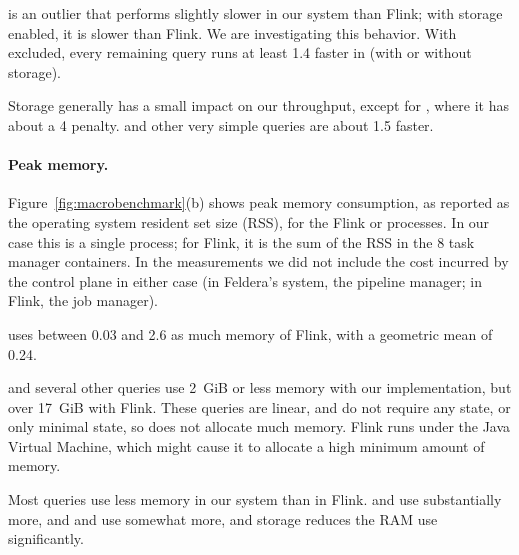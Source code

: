 is an outlier that performs slightly slower in our system
than Flink; with storage enabled, it is slower than Flink.  We are
investigating this behavior.  With  excluded, every
remaining query runs at least 1.4\x{} faster in \dbsp (with or without
storage).

Storage generally has a small impact on our throughput, except for
, where it has about a 4\x{} penalty.   and other
very simple queries are about 1.5\x{} faster.

\paragraph{Peak memory.}

Figure~\ref{fig:macrobenchmark}(b) shows peak memory consumption, as
reported as the operating system resident set size (RSS), for the
Flink or \dbsp processes.  In our case this is a single process; for
Flink, it is the sum of the RSS in the 8 task manager containers.  In
the measurements we did not include the cost incurred by the control
plane in either case (in Feldera's system, the pipeline manager; in
Flink, the job manager).

\dbsp uses between 0.03\x{} and 2.6\x{} as much memory of Flink, with a
geometric mean of 0.24\x{}.

 and several other queries use 2~GiB or less memory with our
implementation, but over 17~GiB with Flink.  These queries are linear,
and do not require any state, or only minimal state, so \dbsp does not
allocate much memory.  Flink runs under the Java Virtual Machine,
which might cause it to allocate a high minimum amount of memory.

Most queries use less memory in our system than in Flink.  
and  use substantially more, and  and
 use somewhat more, and storage reduces the RAM use
significantly.
